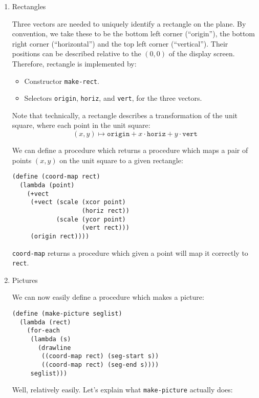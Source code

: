 \documentclass[9pt]{report}
\begin{document}
\begin{enumerate}
\item Rectangles
\label{sec:org470a6ec}

Three vectors are needed to uniquely identify a rectangle on the
plane. By convention, we take these to be the bottom left corner
(``origin''), the bottom right corner (``horizontal'') and the top
left corner (``vertical''). Their positions can be described
relative to the \((0,0)\) of the display screen. Therefore,
rectangle is implemented by:
\begin{itemize}
\item Constructor \texttt{make-rect}.
\item Selectors \texttt{origin}, \texttt{horiz}, and \texttt{vert}, for the three vectors.
\end{itemize}

Note that technically, a rectangle describes a transformation of
the unit square, where each point in the unit square:
$$(x,y)\mapsto \mathtt{origin} + x\cdot \mathtt{horiz} + y\cdot
     \mathtt{vert}$$

We can define a procedure which returns a procedure which maps
a pair of points \((x,y)\) on the unit square to a given rectangle:

\begin{verbatim}
(define (coord-map rect)
  (lambda (point)
    (+vect
     (+vect (scale (xcor point)
                   (horiz rect))
            (scale (ycor point)
                   (vert rect)))
     (origin rect))))
\end{verbatim}

\texttt{coord-map} returns a procedure which given a point will map it
correctly to \texttt{rect}.

\item Pictures
\label{sec:org7ba0ac5}

We can now easily define a procedure which makes a picture:
\begin{verbatim}
(define (make-picture seglist)
  (lambda (rect)
    (for-each
     (lambda (s)
       (drawline
        ((coord-map rect) (seg-start s))
        ((coord-map rect) (seg-end s))))
     seglist)))
\end{verbatim}

Well, relatively easily. Let's explain what \texttt{make-picture}
actually does:


\end{enumerate}
\end{document}
